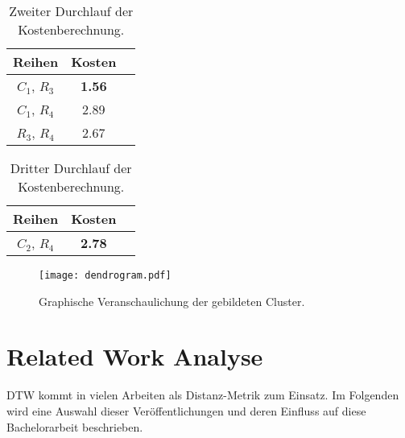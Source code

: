 \begin{table}[ht]
    \begin{center}
        \begin{tabular}{ |c|c|c| } 
         \hline
         Reihen & Kosten \\
         \hline \hline
         $C_{1}$, $R_{3}$ & \textbf{1.56} \\
         \hline
         $C_{1}$, $R_{4}$ & 2.89 \\
         \hline
         $R_{3}$, $R_{4}$ & 2.67 \\
         \hline
        \end{tabular}
        \caption{Zweiter Durchlauf der Kostenberechnung.}
        \label{tbl:ExampleCost2}
    \end{center}
\end{table}
\begin{table}[ht]
    \begin{center}
        \begin{tabular}{ |c|c|c| } 
         \hline
         Reihen & Kosten \\
         \hline \hline
         $C_{2}$, $R_{4}$ & \textbf{2.78} \\
         \hline
        \end{tabular}
        \caption{Dritter Durchlauf der Kostenberechnung.}
        \label{tbl:ExampleCost3}
    \end{center}
\end{table}
\begin{figure}[ht]
    \begin{center}
    \texttt{[image: dendrogram.pdf]}
    \end{center}
    \caption{Graphische Veranschaulichung der gebildeten Cluster.}
    \label{fig:Dendrogram}
\end{figure}

\clearpage
\section{Related Work Analyse}
\label{3-RelatedWork}
\ac{DTW} kommt in vielen Arbeiten als Distanz-Metrik zum Einsatz.
Im Folgenden wird eine Auswahl dieser Veröffentlichungen und deren Einfluss auf diese Bachelorarbeit beschrieben.

